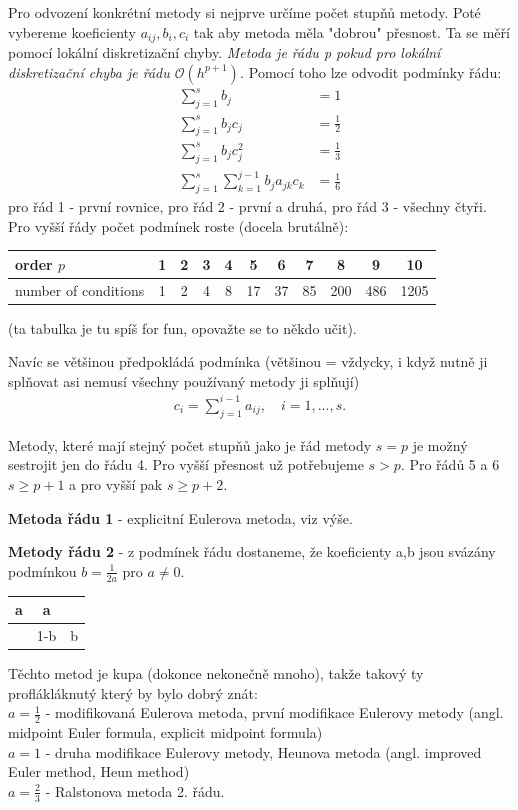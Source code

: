 Pro odvození konkrétní metody si nejprve určíme počet stupňů metody. Poté vybereme koeficienty $a_{ij}, b_{i}, c_{i}$ tak aby metoda měla "dobrou" přesnost. Ta se měří pomocí lokální diskretizační chyby.\textit{ Metoda je řádu \textit{p} pokud pro lokální diskretizační chyba je řádu $\mathcal{O}(h^{p+1})$.} Pomocí toho lze odvodit podmínky řádu:
 \begin{align*}
 \sum _{j=1} ^{s}  b_{j} &= 1 \nonumber \\
 \sum _{j=1} ^{s}  b_{j}c_{j} &= \frac{1}{2}  \nonumber \\
 \sum _{j=1} ^{s} b_{j}c_{j}^{2}  &= \frac{1}{3} \nonumber \\
 \sum_{j=1} ^{s}  \sum _{k=1} ^{j-1} b_{j}a_{jk}c_{k}  &= \frac{1}{6} \nonumber
 \end{align*}
pro řád 1 - první rovnice, pro řád 2 - první a druhá, pro řád 3 - všechny čtyři. Pro vyšší řády počet podmínek roste (docela brutálně):
\begin{center}
\begin{tabular}{l|cccccccccc}
order $p$ & 1 & 2& 3& 4& 5&6&7&8&9&10 \\ \hline
number of conditions & 1 & 2& 4& 8& 17& 37& 85& 200& 486& 1205
\end{tabular}
\end{center}
(ta tabulka je tu spíš for fun, opovažte se to někdo učit).


Navíc se většinou předpokládá podmínka (většinou = vždycky, i když nutně ji splňovat asi nemusí všechny používaný metody ji splňují)
\begin{align}
c_{i}=\sum _{j=1} ^{i-1} a_{ij},\quad i=1,...,s.
\end{align}

Metody, které mají stejný počet stupňů jako je řád metody $s=p$ je možný sestrojit jen do řádu 4. Pro vyšší přesnost už potřebujeme $s > p$. Pro řádů 5 a 6 $s \geq p+1$ a pro vyšší pak $s \geq p+2$. 

\textbf{Metoda řádu 1} - explicitní Eulerova metoda, viz výše. 

\textbf{Metody řádu 2} - z podmínek řádu dostaneme, že koeficienty a,b jsou svázány podmínkou $b= \frac{1}{2a}$ pro $a\neq 0$. 
\begin{center}
\begin{tabular}{c|cc}
a & a \\ \hline
& 1-b & b
\end{tabular}
\end{center}
Těchto metod je kupa (dokonce nekonečně mnoho), takže takový ty proflákláknutý  který by bylo dobrý znát: \\
$a=\frac{1}{2}$ - modifikovaná Eulerova metoda, první modifikace Eulerovy metody (angl. midpoint Euler formula, explicit midpoint formula) \\
$a= 1$ - druha modifikace Eulerovy metody, Heunova metoda (angl. improved Euler method, Heun method) \\
$a=\frac{2}{3}$ - Ralstonova metoda 2. řádu. 

